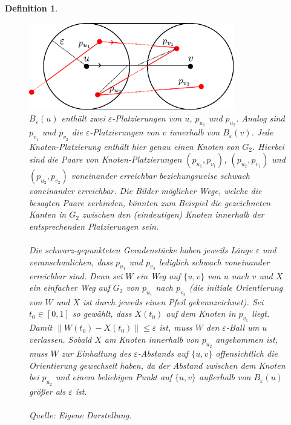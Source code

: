 \documentclass[a4paper, 12pt, twoside]{article}
\theoremstyle{Format1} %
\newtheorem{Def}{Definition}[section]       %
\begin{document}
\begin{Def}
	\begin{figure}[H]
	    \centering
	    \includegraphics[width=0.8\textwidth]{chapter_3_placements_example.pdf}
		\caption{$B_{\varepsilon}(u)$ enthält zwei $\varepsilon$-Platzierungen von $u$, $p_{u_1}$ und $p_{u_2}$. Analog sind $p_{v_1}$ und $p_{v_2}$
		die $\varepsilon$-Platzierungen von $v$ innerhalb von $B_{\varepsilon}(v)$. Jede Knoten-Platzierung enthält hier genau einen Knoten von $G_2$.
		Hierbei sind die Paare von Knoten-Platzierungen
		$(p_{u_1},p_{v_1})$, $(p_{u_2},p_{v_1})$ und $(p_{u_2},p_{v_2})$ voneinander erreichbar beziehungsweise schwach voneinander erreichbar.
		Die Bilder möglicher Wege, welche die besagten Paare verbinden, könnten zum Beispiel die
		gezeichneten Kanten in $G_2$ zwischen den (eindeutigen) Knoten innerhalb der entsprechenden Platzierungen sein.
		\\
		\\
		Die schwarz-gepunkteten Geradenstücke haben jeweils Länge $\varepsilon$ und veranschaulichen, dass $p_{u_1}$ und $p_{v_2}$ lediglich schwach voneinander erreichbar sind.
		Denn sei $W$ ein Weg auf $\{u,v\}$ von $u$ nach $v$ und $X$ ein einfacher Weg auf $G_2$ von $p_{u_1}$ nach $p_{v_2}$ (die initiale Orientierung von $W$ und $X$ ist durch jeweils einen Pfeil gekennzeichnet).
		Sei $t_0 \in [0,1]$ so gewählt, dass $X(t_0)$ auf dem Knoten in $p_{v_1}$ liegt. Damit $\|W(t_0)-X(t_0)\| \leq \varepsilon$ ist, muss $W$ den $\varepsilon$-Ball um $u$ verlassen.
		Sobald $X$ am Knoten innerhalb von $p_{u_2}$ angekommen ist, muss $W$ zur Einhaltung des $\varepsilon$-Abstands auf $\{u,v\}$ offensichtlich die Orientierung gewechselt haben, da
		der Abstand zwischen dem Knoten bei $p_{u_2}$ und einem beliebigen Punkt auf $\{u,v\}$ außerhalb von $B_{\varepsilon}(u)$ größer als $\varepsilon$ ist.
		\\
		\\
		Quelle: Eigene Darstellung.
		}
	    \label{chapter_3_placements_example}
	\end{figure}

\end{Def}
\end{document}
